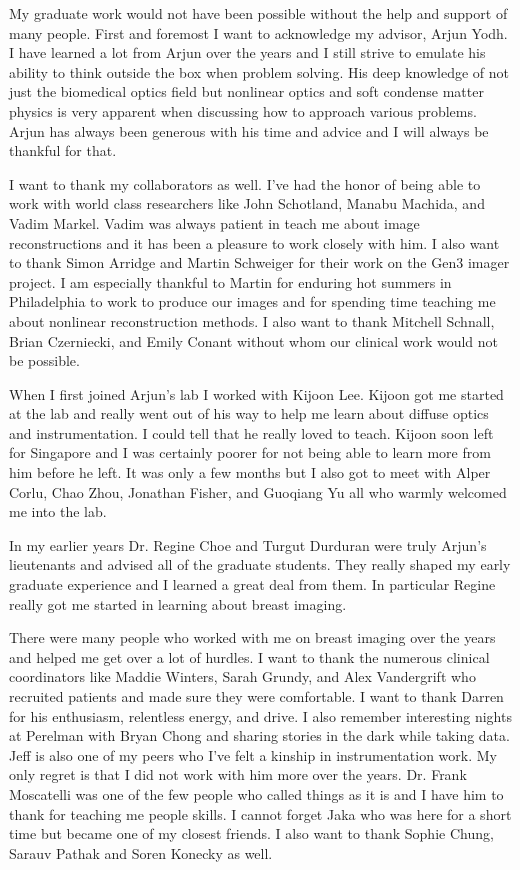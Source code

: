 My graduate work would not have been possible without the help and support of many people. First and foremost I want to acknowledge my advisor, Arjun Yodh. I have learned a lot from Arjun over the years and I still strive to emulate his ability to think outside the box when problem solving. His deep knowledge of not just the biomedical optics field but nonlinear optics and soft condense matter physics is very apparent when discussing how to approach various problems. Arjun has always been generous with his time and advice and I will always be thankful for that.

I want to thank my collaborators as well. I've had the honor of being able to work with world class researchers like John Schotland, Manabu Machida, and Vadim Markel. Vadim was always patient in teach me about image reconstructions and it has been a pleasure to work closely with him. I also want to thank Simon Arridge and Martin Schweiger for their work on the Gen3 imager project. I am especially thankful to Martin for enduring hot summers in Philadelphia to work to produce our images and for spending time teaching me about nonlinear reconstruction methods. I also want to thank Mitchell Schnall, Brian Czerniecki, and Emily Conant without whom our clinical work would not be possible.

When I first joined Arjun's lab I worked with Kijoon Lee. Kijoon got me started at the lab and really went out of his way to help me learn about diffuse optics and instrumentation. I could tell that he really loved to teach. Kijoon soon left for Singapore and I was certainly poorer for not being able to learn more from him before he left. It was only a few months but I also got to meet with Alper Corlu, Chao Zhou, Jonathan Fisher, and Guoqiang Yu all who warmly welcomed me into the lab.
    
In my earlier years Dr. Regine Choe and Turgut Durduran were truly Arjun's lieutenants and advised all of the graduate students. They really shaped my early graduate experience and I learned a great deal from them. In particular Regine really got me started in learning about breast imaging.
    
There were many people who worked with me on breast imaging over the years and helped me get over a lot of hurdles. I want to thank the numerous clinical coordinators like Maddie Winters, Sarah Grundy, and Alex Vandergrift who recruited patients and made sure they were comfortable. I want to thank Darren for his enthusiasm, relentless energy, and drive. I also remember interesting nights at Perelman with Bryan Chong and sharing stories in the dark while taking data. Jeff is also one of my peers who I've felt a kinship in instrumentation work. My only regret is that I did not work with him more over the years. Dr. Frank Moscatelli was one of the few people who called things as it is and I have him to thank for teaching me people skills. I cannot forget Jaka who was here for a short time but became one of my closest friends. I also want to thank Sophie Chung, Sarauv Pathak and Soren Konecky as well.

